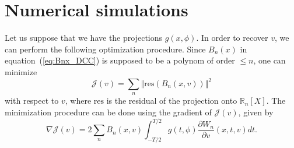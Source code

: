 \documentclass[a4paper]{article}
\numberwithin{equation}{section}
\newcommand{\R}{\mathbb{R}}
\begin{document}
\section{Numerical simulations}

Let us suppose that we have the projections $g(x,\phi)$. In order to recover $v$, we can perform the following optimization procedure. Since $B_n(x)$ in equation~(\ref{eq:Bnx_DCC}) is supposed to be a polynom of order $\leq n$, one can minimize
\begin{equation}
	\mathcal{J}(v) = \sum_n \Vert \textrm{res} \left( B_n(x,v) \right) \Vert^2
\end{equation}
with respect to $v$, where $\textrm{res}$ is the residual of the projection onto $\R_n[X]$. The minimization procedure can be done using the gradient of $\mathcal{J}(v)$, given by
\begin{equation}
	\nabla \mathcal{J}(v) = 2 \sum_n B_n(x,v) \int_{-T/2}^{T/2} g(t,\phi) \frac{\partial W_n}{\partial v}(x,t,v) dt.
\end{equation}



\end{document}
